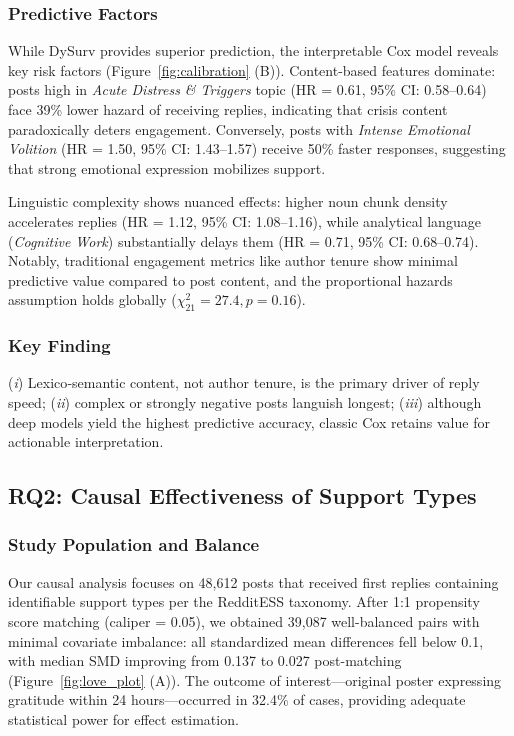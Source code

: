\documentclass[letterpaper]{article} %
\begin{document}
\subsubsection{Predictive Factors}

While DySurv provides superior prediction, the interpretable Cox model reveals key risk factors (Figure~\ref{fig:calibration} (B)). Content-based features dominate: posts high in \emph{Acute Distress \& Triggers} topic (HR = 0.61, 95\% CI: 0.58–0.64) face 39\% lower hazard of receiving replies, indicating that crisis content paradoxically deters engagement. Conversely, posts with \emph{Intense Emotional Volition} (HR = 1.50, 95\% CI: 1.43–1.57) receive 50\% faster responses, suggesting that strong emotional expression mobilizes support.

Linguistic complexity shows nuanced effects: higher noun chunk density accelerates replies (HR = 1.12, 95\% CI: 1.08–1.16), while analytical language (\emph{Cognitive Work}) substantially delays them (HR = 0.71, 95\% CI: 0.68–0.74). Notably, traditional engagement metrics like author tenure show minimal predictive value compared to post content, and the proportional hazards assumption holds globally ($\chi^2_{21} = 27.4, p = 0.16$).

\subsubsection{Key Finding}(\emph{i}) Lexico‑semantic content, not author tenure, is the primary
driver of reply speed;
(\emph{ii}) complex or strongly negative posts languish longest;
(\emph{iii}) although deep models yield the highest predictive accuracy,
classic Cox retains value for actionable interpretation.

\subsection{RQ2: Causal Effectiveness of Support Types}

\subsubsection{Study Population and Balance}

Our causal analysis focuses on 48,612 posts that received first replies containing identifiable support types per the RedditESS taxonomy. After 1:1 propensity score matching (caliper = 0.05), we obtained 39,087 well-balanced pairs with minimal covariate imbalance: all standardized mean differences fell below 0.1, with median SMD improving from 0.137 to 0.027 post-matching (Figure~\ref{fig:love_plot} (A)). The outcome of interest—original poster expressing gratitude within 24 hours—occurred in 32.4\% of cases, providing adequate statistical power for effect estimation.
\end{document}

